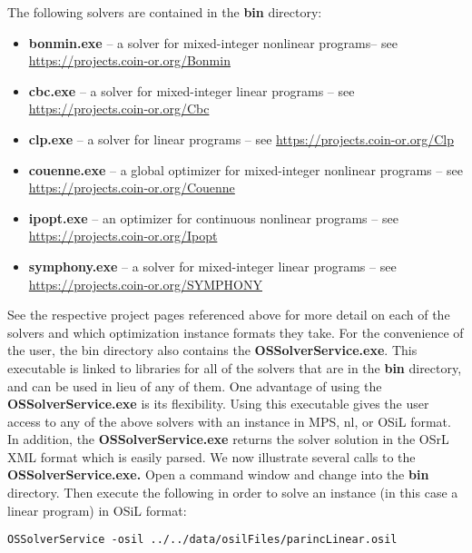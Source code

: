 \documentclass[11pt]{article}
\renewcommand{\_}{{\char"5F}}
\renewcommand{\{}{{\char"7B}}
\renewcommand{\}}{{\char"7D}}
\renewcommand{\^}{{\char"0D}}
\renewcommand{\'}{{\char"0D}}
\begin{document}
The following solvers are contained in the {\bf bin} directory:
\begin{itemize}
\item {\bf bonmin.exe} -- a solver for mixed-integer nonlinear programs-- see \url{https://projects.coin-or.org/Bonmin}

\item {\bf cbc.exe} --  a solver for mixed-integer linear programs --  see \url{https://projects.coin-or.org/Cbc}

\item {\bf clp.exe} -- a solver for linear programs  -- see \url{https://projects.coin-or.org/Clp}

\item {\bf couenne.exe} -- a global optimizer for mixed-integer nonlinear programs  -- see \url{https://projects.coin-or.org/Couenne}

\item {\bf ipopt.exe} -- an optimizer for continuous nonlinear programs -- see \url{https://projects.coin-or.org/Ipopt}

\item {\bf symphony.exe} -- a solver for mixed-integer linear programs -- see \url{https://projects.coin-or.org/SYMPHONY}
\end{itemize}

See the respective project pages referenced above for  more detail on each of the solvers 
and which optimization instance formats they take.  For the convenience of the user, 
the bin directory also contains the {\bf OSSolverService.exe}.  This executable is linked 
to libraries for all of the  solvers that are in the {\bf bin} directory, and can be used 
in lieu of any of them. One advantage of using the {\bf OSSolverService.exe}  is its flexibility. 
Using this executable gives the user access to any of the above solvers with an instance 
in MPS, nl, or OSiL format. In addition, the {\bf OSSolverService.exe} returns the solver 
solution in the OSrL XML format which is easily parsed.  We now illustrate several calls 
to the {\bf OSSolverService.exe.}   
Open a command window and change into the {\bf bin} directory. Then
execute the following in order to solve an instance (in this case a linear program) 
in OSiL format:


\begin{verbatim}
OSSolverService -osil ../../data/osilFiles/parincLinear.osil
\end{verbatim}
\end{document}
